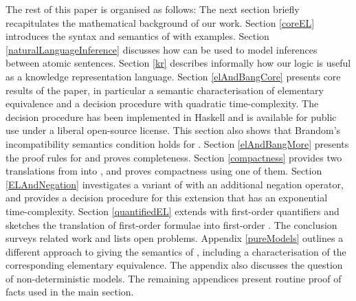 \NI The rest of this paper is organised as follows: The next section
briefly recapitulates the mathematical background of our work.
Section \ref{coreEL} introduces the syntax and semantics of
\cathoristic{} with examples. Section \ref{naturalLanguageInference}
discusses how \cathoristic{} can be used to model inferences between
atomic sentences.  Section \ref{kr} describes informally how our logic
is useful as a knowledge representation language.  Section
\ref{elAndBangCore} presents core results of the paper, in particular
a semantic characterisation of elementary equivalence and a decision
procedure with quadratic time-complexity. The decision procedure has
been implemented in Haskell and is available for public use
\cite{HaskellImplementation} under a liberal open-source
license. This section also
shows that Brandom's incompatibility semantics condition holds for
\cathoristic{}.  Section \ref{elAndBangMore} presents the proof rules
for \cathoristic{} and proves completeness. Section \ref{compactness}
provides two translations from \cathoristic{} into \fol{}, and proves
compactness using one of them.  Section \ref{ELAndNegation}
investigates a variant of \cathoristic{} with an additional negation
operator, and provides a decision procedure for this extension that
has an exponential time-complexity.  Section \ref{quantifiedEL}
extends \cathoristic{} with first-order quantifiers and sketches the
translation of first-order formulae into first-order
\cathoristic{}. The conclusion surveys related work and lists open
problems.  Appendix \ref{pureModels} outlines a different approach to
giving the semantics of \cathoristic{}, including a characterisation
of the corresponding elementary equivalence. The appendix also
discusses the question of non-deterministic models. The remaining
appendices present routine proof of facts used in the main section.
